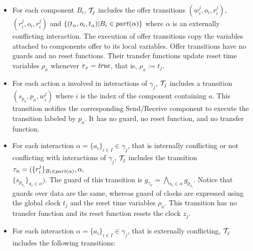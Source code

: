 \begin{definition}[Scheduler]
\begin{itemize}
\begin{itemize}
          \begin{itemize}
            \item For each component $B_i$, $\mathcal{T}_j$ includes the offer transitions 
              $(w_i^j,o_i,r_i^j)$, $(r_i^j,o_i,r_i^j)$ and $\{(t_{\alpha},o_i,t_{\alpha})|
              B_i\in part(\alpha)\}$ where $\alpha$ is an externally conflicting interaction.
              The execution of offer transitions copy the variables attached to components offer
              to its local variables. Offer transitions have no guards and no reset functions. 
              Their transfer functions update reset time 
              variables $\rho_x$ whenever $r_x=\textnormal{\textit{true}}$, that is, $\rho_x:=t_j$. 
            \item For each action $a$ involved in interactions of $\gamma_j$, $\mathcal{T}_j$ includes
              a transition $(s_{p_a},p_a,w_i^j)$ where $i$ is the index of the component
              containing $a$. This transition notifies the corresponding Send/Receive component 
              to execute the transition labeled by $p_a$. It has no guard, no reset function,
              and no transfer function.
            \item For each interaction $\alpha=\{a_i\}_{i\in{I}}\in\gamma_j$, that is 
              internally conflicting or not conflicting with interactions of $\gamma_j$,
              $\mathcal{T}_j$ includes the transition $\tau_{\alpha}=(\{r_i^j\}_{B_i\in part(\alpha)},
              \alpha,$\\$\{s_{p_{a_i}}\}_{a_i\in\alpha})$. The guard of this transition is 
              $g_{\tau_{\alpha}}=
              \bigwedge_{a_i\in\alpha}g_{p_{a_i}}$. Notice that guards over data are the same,
              whereas guard of clocks are expressed using the global clock $t_j$ and the reset
              time variables $\rho_x$. This transition has no transfer function 
              and its reset function resets the clock $z_j$.
            \item For each interaction $\alpha=\{a_i\}_{i\in{I}}\in\gamma_j$, that is 
              externally conflicting,
              $\mathcal{T}_j$ includes the following transitions:
\end{itemize}
\end{itemize}
\end{itemize}
\end{definition}
